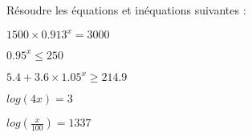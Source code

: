 Résoudre les équations et inéquations suivantes :

\begin{questions}
	
	\question[2] $\num{1500} \times \num{0.913}^x = \num{3000}$
	
	\fillwithdottedlines{3cm}
	
	\question[2] $\num{0.95}^x \leq 250$
	
	\fillwithdottedlines{3cm}
	
	\question[2] $\num{5.4} + \num{3.6} \times \num{1.05}^x \geq \num{214.9}$
	
	\fillwithdottedlines{3cm}
	
	\question[2] $log(4x) = \num{3}$
	
	\fillwithdottedlines{3.5cm}
	
	\question[2] $log\left(\frac{x}{100}\right) = \num{1337}$
	
	\fillwithdottedlines{3.5cm}
\end{questions}